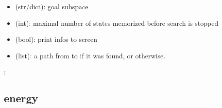 \documentclass[letterpaper,10pt,english]{sphinxmanual}
\begin{document}
\begin{fulllineitems}
\begin{description}
\begin{itemize}
\item {} 
 (str/dict): goal subspace

\item {} 
 (int): maximal number of states memorized before search is stopped

\item {} 
 (bool): print infos to screen

\end{itemize}

\item[{\sphinxstylestrong{returns}:}] \leavevmode\begin{itemize}
\item {} 
 (list): a path from  to  if it was found, or  otherwise.

\end{itemize}

\end{description}

:

\begin{sphinxVerbatim}[commandchars=\\\{\}]
  
  
    
  
\end{sphinxVerbatim}

\end{fulllineitems}



\subsection{energy}
\label{\detokenize{StateTransitionGraphs:energy}}\label{\detokenize{StateTransitionGraphs:id8}}
\end{document}
